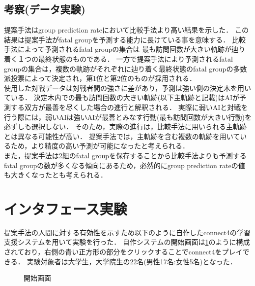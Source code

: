 \subsection{考察(データ実験)}
提案手法はgroup prediction rateにおいて比較手法より高い結果を示した．
この結果は提案手法がfatal groupを予測する能力に長けている事を意味する．
比較手法によって予測されるfatal groupの集合は
最も訪問回数が大きい軌跡が辿り着く１つの最終状態のものである．
一方で提案手法により予測されるfatal groupの集合は，複数の軌跡がそれぞれに辿り着く最終状態のfatal groupの多数派投票によって決定され，第1位と第2位のものが採用される．\\
使用した対戦データは対戦者間の強さに差があり，予測は強い側の決定木を用いている．
決定木内での最も訪問回数の大きい軌跡(以下主軌跡と記載)はAIが予測する双方が最善を尽くした場合の進行と解釈される．
実際に弱いAIと対戦を行う際には，弱いAIは強いAIが最善とみなす行動(最も訪問回数が大きい行動)を必ずしも選択しない．
そのため，実際の進行は，比較手法に用いられる主軌跡とは異なる可能性が高い．
提案手法では，主軌跡を含む複数の軌跡を用いているため，より精度の高い予測が可能になったと考えられる．\\
また，提案手法は2組のfatal groupを保存することから比較手法よりも予測するfatal groupの数が多くなる傾向にあるため，必然的にgroup prediction rateの値も大きくなったとも考えられる．


\section{インタフェース実験}
提案手法の人間に対する有効性を示すため以下のように自作したconnect4の学習支援システムを用いて実験を行った．
自作システムの開始画面は\ref{fig:basic}のように構成されており，右側の青い正方形の部分をクリックすることでconnect4をプレイできる．
実験対象者は大学生，大学院生の22名(男性17名:女性5名)となった．
\begin{figure}[htbp]
    \centering
    \setlength{\fboxsep}{1pt} %
    \setlength{\fboxrule}{1pt} %
    \caption{開始画面}
    \label{fig:basic}
\end{figure}

